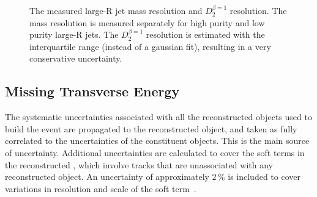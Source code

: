 \begin{figure}[htb]
\centering
{}
\caption[Large-R jet mass and substructure resolution]{The measured large-R jet \protect{} mass resolution and \protect{} $D_2^{\beta=1}$ resolution. The mass resolution is measured separately for high purity and low purity large-R jets. The $D_2^{\beta=1}$ resolution is estimated with the interquartile range (instead of a gaussian fit), resulting in a very conservative uncertainty.}
\label{fig:larger_res}
\end{figure}


%
\subsection{Missing Transverse Energy}
The systematic uncertainties associated with all the reconstructed objects used to build the event \MET are propagated to the reconstructed \MET object, and taken as fully correlated to the uncertainties of the constituent objects. This is the main source of \MET uncertainty. Additional uncertainties are calculated to cover the soft terms in the reconstructed \MET, which involve tracks that are unassociated with any reconstructed object. An uncertainty of approximately 2\,\% is included to cover variations in resolution and scale of the soft term~\cite{met_syst}.


